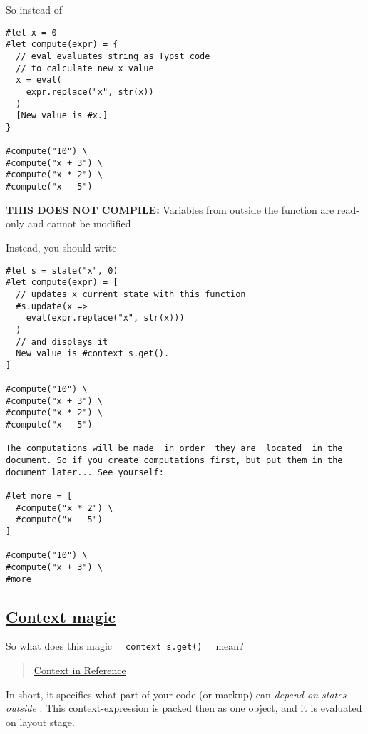 So instead of

\begin{verbatim}
#let x = 0
#let compute(expr) = {
  // eval evaluates string as Typst code
  // to calculate new x value
  x = eval(
    expr.replace("x", str(x))
  )
  [New value is #x.]
}

#compute("10") \
#compute("x + 3") \
#compute("x * 2") \
#compute("x - 5")
\end{verbatim}

\textbf{THIS DOES NOT COMPILE:} Variables from outside the function are
read-only and cannot be modified

Instead, you should write

\begin{verbatim}
#let s = state("x", 0)
#let compute(expr) = [
  // updates x current state with this function
  #s.update(x =>
    eval(expr.replace("x", str(x)))
  )
  // and displays it
  New value is #context s.get().
]

#compute("10") \
#compute("x + 3") \
#compute("x * 2") \
#compute("x - 5")

The computations will be made _in order_ they are _located_ in the document. So if you create computations first, but put them in the document later... See yourself:

#let more = [
  #compute("x * 2") \
  #compute("x - 5")
]

#compute("10") \
#compute("x + 3") \
#more
\end{verbatim}

\pandocbounded{}

\subsection{\texorpdfstring{\hyperref[context-magic]{Context
magic}}{Context magic}}\label{context-magic}

So what does this magic
\texttt{\ }{\texttt{\ context\ s.get()\ }}\texttt{\ } mean?

\begin{quote}
\href{https://typst.app/docs/reference/context/}{Context in Reference}
\end{quote}

In short, it specifies what part of your code (or markup) can
\emph{depend on states outside} . This context-expression is packed then
as one object, and it is evaluated on layout stage.

